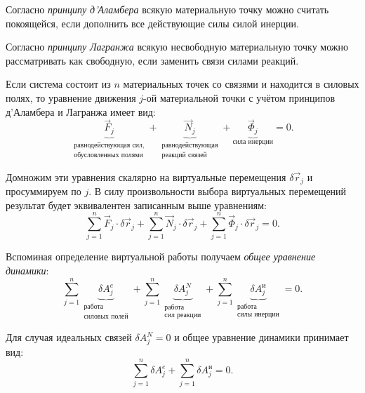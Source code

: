 
Согласно \textit{принципу д'Аламбера} всякую материальную точку можно считать
покоящейся, если дополнить все действующие силы силой инерции.

Согласно  \textit{принципу Лагранжа} всякую несвободную материальную точку
можно рассматривать как свободную, если заменить связи силами реакций.

Если система состоит из \( n \) материальных точек со связями и находится в
силовых полях, то уравнение движения \( j \)-ой материальной точки с учётом
принципов д'Аламбера и Лагранжа имеет вид:
\[
    \underbrace{\vec{F}_{j}}_{
        \substack{\textbf{равнодействующая сил,} \\
        \textbf{обусловленных полями}}}
    + 
    \underbrace{\vec{N}_{j} }_{
            \substack{\textbf{равнодействующая} \\ \textbf{реакций связей}}
            }
    +
    \underbrace{\vec{\Phi}_{j}}_{
            \textbf{сила инерции}
            }   
    = 0.
\]

Домножим эти уравнения скалярно на виртуальные перемещения
\( \delta\vec{r}_{j} \) и просуммируем по \( j \). В силу произвольности выбора
виртуальных перемещений результат будет эквивалентен записанным выше
уравнениям:
\[
    \sum\limits_{j=1}^n \vec{F}_{j}\cdot\delta\vec{r}_{j}+
    \sum\limits_{j=1}^n \vec{N}_{j}\cdot\delta\vec{r}_{j}+
    \sum\limits_{j=1}^n \vec{\Phi}_{j}\cdot\delta\vec{r}_{j}
    = 0.
\]  
    
Вспоминая определение виртуальной работы получаем
\emph{общее уравнение динамики}:
\[
    \sum\limits_{j=1}^n \underbrace{\delta A^e_j}_{
        \substack{\textbf{работа} \\ \textbf{силовых полей}}    
        }
    + 
    \sum\limits_{j=1}^n\underbrace{ \delta A^N_j}_{
            \substack{\textbf{работа} \\ \textbf{сил реакции}}
            }
    +
    \sum\limits_{j=1}^n\underbrace{ \delta A^\text{и}_j}_{
            \substack{\textbf{работа} \\ \textbf{силы инерции}}
            }   
    = 0.
\]

Для случая идеальных связей \( \delta A^N_j = 0 \) и общее уравнение динамики
принимает вид:
\[
    \sum\limits_{j=1}^n \delta A^e_j +
    \sum\limits_{j=1}^n \delta A^\text{и}_j
    =0.
\]

\newpage %
